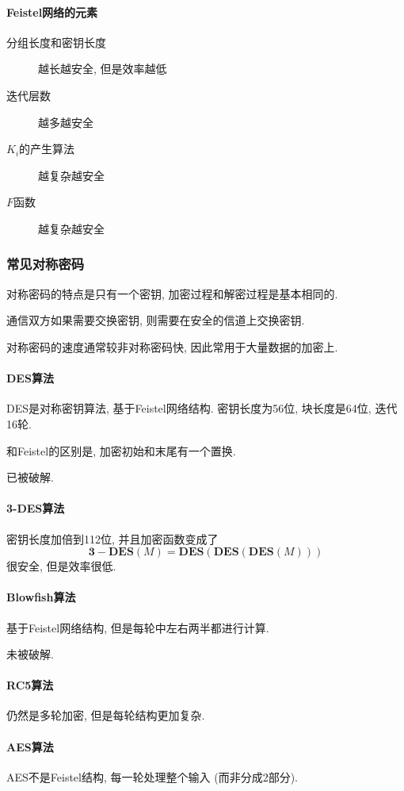 \documentclass{ctexart}
\begin{document}
\paragraph{Feistel网络的元素}
    \begin{description}
        \item[分组长度和密钥长度] 越长越安全, 但是效率越低
        \item[迭代层数] 越多越安全
        \item[$K_i$的产生算法] 越复杂越安全
        \item[$F$函数] 越复杂越安全
    \end{description}

\subsubsection{常见对称密码}
    对称密码的特点是只有一个密钥, 加密过程和解密过程是基本相同的.\par
    通信双方如果需要交换密钥, 则需要在安全的信道上交换密钥.\par
    对称密码的速度通常较非对称密码快, 因此常用于大量数据的加密上.\par
\paragraph{DES算法}
    DES是对称密钥算法, 基于Feistel网络结构.
    密钥长度为56位, 块长度是64位, 迭代16轮.\par
    和Feistel的区别是, 加密初始和末尾有一个置换.\par
    已被破解.
\paragraph{3-DES算法}
    密钥长度加倍到112位, 并且加密函数变成了 \[
        \mathbf{3-DES}(M) = \mathbf{DES}(\mathbf{DES}(\mathbf{DES}(M))) \]
    很安全, 但是效率很低.
\paragraph{Blowfish算法}
    基于Feistel网络结构, 但是每轮中左右两半都进行计算.\par
    未被破解.
\paragraph{RC5算法}
    仍然是多轮加密, 但是每轮结构更加复杂.
\paragraph{AES算法}
    AES不是Feistel结构, 每一轮处理整个输入 (而非分成2部分).
\end{document}
